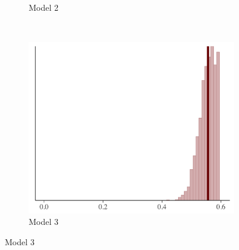 \documentclass[t]{beamer}
\begin{document}
\begin{frame}
\begin{figure}
\begin{subfigure}{0.31\textwidth}
\caption{Model 2}
\end{subfigure}
~
\begin{subfigure}{0.31\textwidth}
\includegraphics[width=\textwidth]{ppc_skew3.png}
\caption{Model 3}
\end{subfigure}

\end{figure}

\end{frame}
\end{document}
